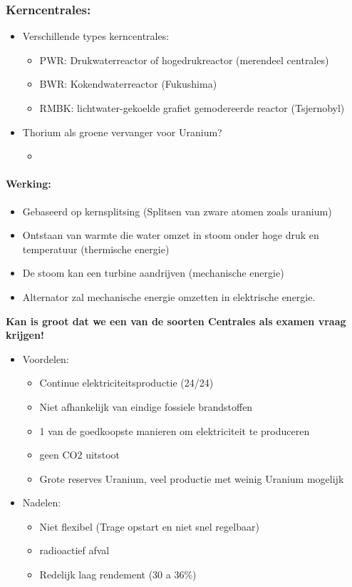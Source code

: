 \documentclass[12pt]{article}
\begin{document}
\subsubsection{Kerncentrales:}
\begin{itemize}
    \item Verschillende types kerncentrales:\begin{itemize}
        \item PWR: Drukwaterreactor of hogedrukreactor (merendeel centrales)
        \item BWR: Kokendwaterreactor (Fukushima)
        \item RMBK: lichtwater-gekoelde grafiet gemodereerde reactor (Tsjernobyl)
    \end{itemize}
    \item Thorium als groene vervanger voor Uranium?\begin{itemize}
        \item %
    \end{itemize}
\end{itemize}
\paragraph{Werking:}
\begin{itemize}
    \item Gebaseerd op kernsplitsing (Splitsen van zware atomen zoals uranium)
    \item Ontstaan van warmte die water omzet in stoom onder hoge druk en temperatuur (thermische energie)
    \item De stoom kan een turbine aandrijven (mechanische energie)
    \item Alternator zal mechanische energie omzetten in elektrische energie.
\end{itemize}
\textbf{Kan is groot dat we een van de soorten Centrales als examen vraag krijgen!}
\begin{itemize}
    \item Voordelen:\begin{itemize}
        \item Continue elektriciteitsproductie (24/24)
        \item Niet afhankelijk van eindige fossiele brandstoffen
        \item 1 van de goedkoopste manieren om elektriciteit te produceren
        \item geen CO2 uitstoot
        \item Grote reserves Uranium, veel productie met weinig Uranium mogelijk
    \end{itemize}
    \item Nadelen:\begin{itemize}
        \item Niet flexibel (Trage opstart en niet snel regelbaar)
        \item radioactief afval 
        \item Redelijk laag rendement (30 a 36\%)
    \end{itemize}
\end{itemize}
\end{document}
